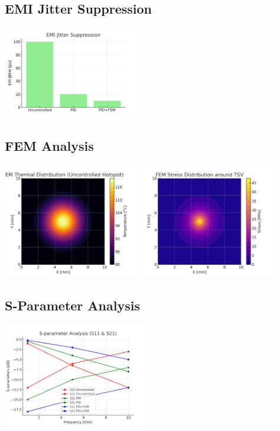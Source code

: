 \documentclass[journal]{IEEEtran} %
\begin{document}
\subsection{EMI Jitter Suppression}
\includegraphics[width=0.45\textwidth]{sim_emi_jitter.png}

\subsection{FEM Analysis}
\includegraphics[width=0.45\textwidth]{fem_thermal_map.png}
\includegraphics[width=0.45\textwidth]{fem_stress_map.png}

\subsection{S-Parameter Analysis}
\includegraphics[width=0.48\textwidth]{sparam_s11s21.png}
\end{document}

